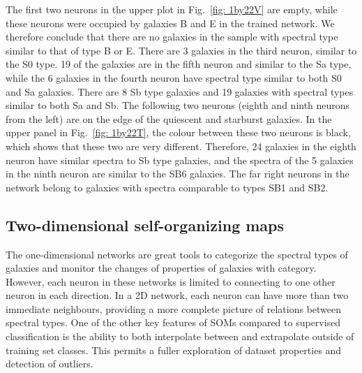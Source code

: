            The first two neurons in the upper plot in Fig.~\ref{fig: 1by22V} are empty, while these neurons were occupied by galaxies B and E in the trained network.
            We therefore conclude that there are no galaxies in the  sample with spectral type similar to that of type B or E.
            There are 3 galaxies in the third neuron, similar to the S0 type. 
            19 of the galaxies are in the fifth neuron and similar to the Sa type, while the 6 galaxies in the fourth neuron have spectral type similar to both S0 and Sa galaxies.
            There are 8 Sb type galaxies and 19 galaxies with spectral types similar to both Sa and Sb.
            The following two neurons (eighth and ninth neurons from the left) are on the edge of the quiescent and starburst galaxies.
            In the upper panel in Fig.~\ref{fig: 1by22T}, the colour between these two neurons is black, which shows that these two are very different.
            Therefore, 24 galaxies in the eighth neuron have similar spectra to Sb type galaxies, and the spectra of the 5 galaxies in the ninth neuron are similar to the SB6 galaxies.
            The far right neurons in the network belong to galaxies with spectra comparable to types SB1 and SB2.
            
            
    
   

      
    \subsection{Two-dimensional self-organizing maps}
    \label{sec: 2D}
        The one-dimensional networks are great tools to categorize the spectral types of galaxies and monitor the changes of properties of galaxies with category.
        However, each neuron in these networks is limited to connecting to one other neuron in each direction.
        In a 2D network, each neuron can have more than two immediate neighbours, providing a more complete picture of relations between spectral types.
        One of the other key features of SOMs compared to supervised classification is the ability to both interpolate between and extrapolate outside of training set classes.
        This permits a fuller exploration of dataset properties and detection of outliers.
        
